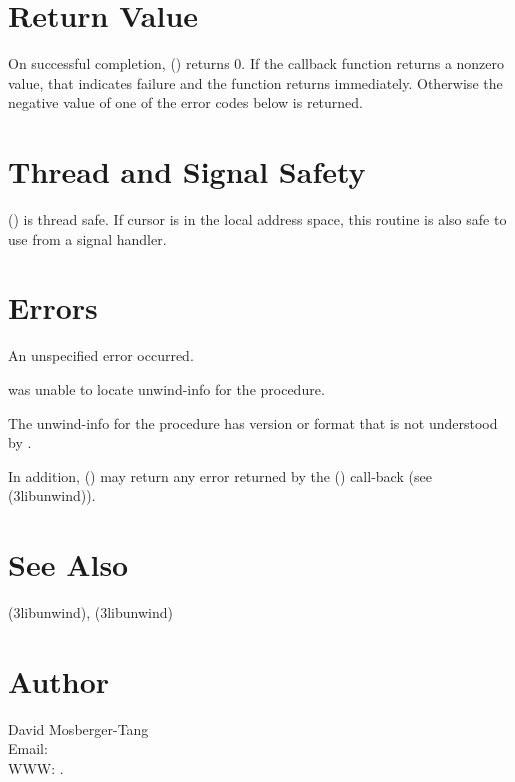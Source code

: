\documentclass{article}
\begin{document}
\section{Return Value}

On successful completion, () returns
0.  If the callback function returns a nonzero value, that indicates
failure and the function returns immediately.  Otherwise the negative
value of one of the error codes below is returned.

\section{Thread and Signal Safety}

() is thread safe.  If cursor  is
in the local address space, this routine is also safe to use from a
signal handler.

\section{Errors}

\begin{Description}
\item[\Const{UNW\_EUNSPEC}] An unspecified error occurred.
\item[\Const{UNW\_ENOINFO}]  was unable to locate
  unwind-info for the procedure.
\item[\Const{UNW\_EBADVERSION}] The unwind-info for the procedure has
  version or format that is not understood by .
\end{Description}
In addition, () may return any error
returned by the () call-back (see
(3libunwind)).

\section{See Also}

(3libunwind),
(3libunwind)

\section{Author}

\noindent
David Mosberger-Tang\\
Email: \\
WWW: .
\LatexManEnd
\end{document}
